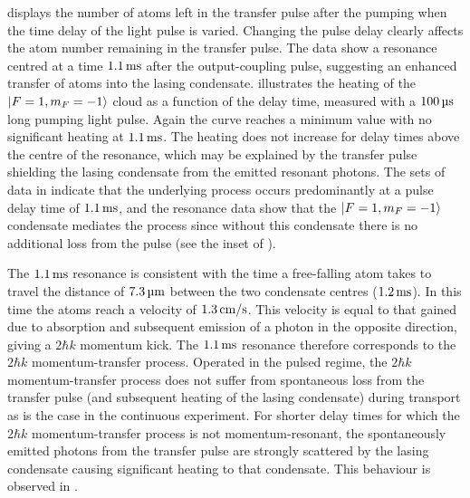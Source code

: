  displays the number of atoms left in the transfer pulse after the pumping when the time delay of the light pulse is varied.  Changing the pulse delay clearly affects the atom number remaining in the transfer pulse.  The data show a resonance centred at a time $\unit[1.1]{ms}$ after the output-coupling pulse, suggesting an enhanced transfer of atoms into the lasing condensate.   illustrates the heating of the ${\left|F=1, m_F=-1\right>}$ cloud as a function of the delay time, measured with a $\unit[100]{\micro s}$ long pumping light pulse.  Again the curve reaches a minimum value with no significant heating at $\unit[1.1]{ms}$.  The heating does not increase for delay times above the centre of the resonance, which may be explained by the transfer pulse shielding the lasing condensate from the emitted resonant photons.  The sets of data in  indicate that the underlying process occurs predominantly at a pulse delay time of $\unit[1.1]{ms}$, and the resonance data show that the ${\left|F=1, m_F=-1\right>}$ condensate mediates the process since without this condensate there is no additional loss from the pulse (see the inset of ).

The $\unit[1.1]{ms}$ resonance is consistent with the time a free-falling atom takes to travel the distance of $\unit[7.3]{\micro m}$ between the two condensate centres ($\unit[1.2]{ms}$).  In this time the atoms reach a velocity of $\unit[1.3]{cm/s}$.  This velocity is equal to that gained due to absorption and subsequent emission of a photon in the opposite direction, giving a $2 \hbar k$ momentum kick.  The $\unit[1.1]{ms}$ resonance therefore corresponds to the $2 \hbar k$ momentum-transfer process.  Operated in the pulsed regime, the $2 \hbar k$ momentum-transfer process does not suffer from spontaneous loss from the transfer pulse (and subsequent heating of the lasing condensate) during transport as is the case in the continuous experiment.  For shorter delay times for which the $2 \hbar k$ momentum-transfer process is not momentum-resonant, the spontaneously emitted photons from the transfer pulse are strongly scattered by the lasing condensate causing significant heating to that condensate.  This behaviour is observed in .

